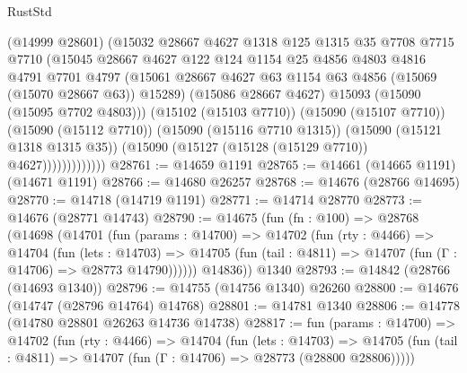 \begin{lexlean}{RustStd}
\begin{coremodule}
                        (@14999 @28601)
                        (@15032
                          @28667
                          @4627
                          @1318
                          @125
                          @1315
                          @35
                          @7708
                          @7715
                          @7710
                          (@15045
                            @28667
                            @4627
                            @122
                            @124
                            @1154
                            @25
                            @4856
                            @4803
                            @4816
                            @4791
                            @7701
                            @4797
                            (@15061
                              @28667
                              @4627
                              @63
                              @1154
                              @63
                              @4856
                              (@15069 (@15070 @28667 @63))
                              @15289)
                            (@15086 @28667 @4627)
                            @15093
                            (@15090 (@15095 @7702 @4803)))
                          (@15102 (@15103 @7710))
                          (@15090 (@15107 @7710))
                          (@15090 (@15112 @7710))
                          (@15090 (@15116 @7710 @1315))
                          (@15090 (@15121 @1318 @1315 @35))
                          (@15090 (@15127 (@15128 (@15129 @7710)) @4627)))))))))))))
@28761 := @14659 @1191
@28765 := @14661 (@14665 @1191) (@14671 @1191)
@28766 := @14680 @26257
@28768 := @14676 (@28766 @14695)
@28770 := @14718 (@14719 @1191)
@28771 := @14714 @28770
@28773 := @14676 (@28771 @14743)
@28790 := @14675
    (fun (fn : @100) =>
    @28768
      (@14698
        (@14701
          (fun (params : @14700) =>
          @14702
            (fun (rty : @4466) =>
            @14704
              (fun (lets : @14703) =>
              @14705 (fun (tail : @4811) => @14707 (fun (Γ : @14706) => @28773 @14790))))))
        @14836))
    @1340
@28793 := @14842 (@28766 (@14693 @1340))
@28796 := @14755 (@14756 @1340) @26260
@28800 := @14676 (@14747 (@28796 @14764) @14768)
@28801 := @14781 @1340
@28806 := @14778 (@14780 @28801 @26263 @14736 @14738)
@28817 := fun (params : @14700) =>
  @14702
    (fun (rty : @4466) =>
    @14704
      (fun (lets : @14703) =>
      @14705 (fun (tail : @4811) => @14707 (fun (Γ : @14706) => @28773 (@28800 @28806)))))

\end{coremodule}
\end{lexlean}

